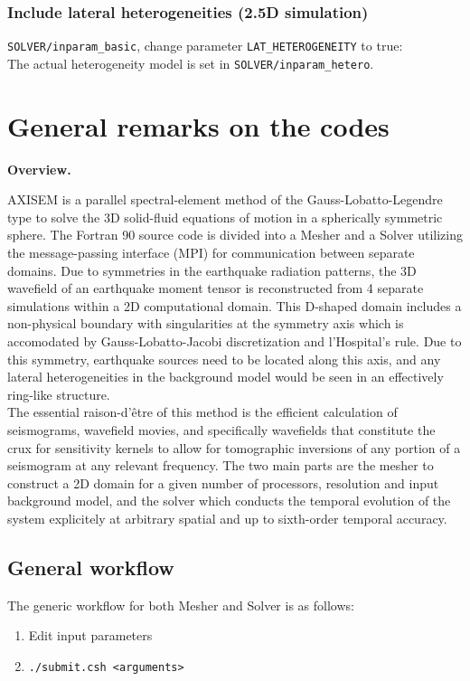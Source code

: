 \documentclass[11pt,letter,fleqn,english,notitlepage]{article}
\begin{document}
\subsubsection{Include lateral heterogeneities (2.5D simulation)}
\verb|SOLVER/inparam_basic|, change parameter \verb|LAT_HETEROGENEITY| to true:\\
The actual heterogeneity model is set in \verb|SOLVER/inparam_hetero|. 


\section{General remarks on the codes}

\textbf{Overview.} 

AXISEM is a parallel spectral-element method of the Gauss-Lobatto-Legendre type
to solve the 3D solid-fluid equations of motion in a spherically symmetric
sphere. The Fortran 90 source code is divided into a Mesher and a Solver
utilizing the message-passing interface (MPI) for communication between
separate domains. Due to symmetries in the earthquake radiation patterns, the
3D wavefield of an earthquake moment tensor is reconstructed from 4 separate
simulations within a 2D computational domain. This D-shaped domain
includes a non-physical boundary with singularities at the symmetry axis which
is accomodated by Gauss-Lobatto-Jacobi discretization and l'Hospital's rule.
Due to this symmetry, earthquake
sources need to be located along this axis, and any lateral heterogeneities in
the background model would be seen in an effectively ring-like structure.\\

The essential raison-d'\^{e}tre of this method is the efficient calculation of
seismograms, wavefield movies, and specifically wavefields that constitute the
crux for sensitivity kernels to allow for tomographic inversions of any portion
of a seismogram at any relevant frequency. The two main parts are the mesher to
construct a 2D domain for a given number of processors, resolution and input
background model, and the solver which conducts the temporal evolution of the
system explicitely at arbitrary spatial and up to sixth-order temporal
accuracy.\\


\subsection{General workflow}
The generic workflow for both Mesher and Solver is as follows:
\begin{enumerate}
    \item Edit input parameters
    \item {\tt ./submit.csh <arguments>}
\end{enumerate}
\end{document}
